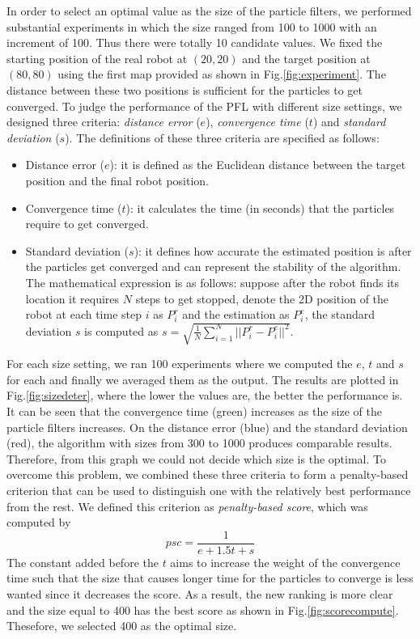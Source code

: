 \documentclass[12pt]{article}
\begin{document}
In order to select an optimal value as the size of the particle filters, we performed substantial experiments in which the size ranged from 100 to 1000 with an increment of 100. Thus there were totally 10 candidate values. We fixed the starting position of the real robot at $(20,20)$ and the target position at $(80,80)$ using the first map provided as shown in Fig.\ref{fig:experiment}. The distance between these two positions is sufficient for the particles to get converged. To judge the performance of the PFL with different size settings, we designed three criteria: {\itshape distance error} ($e$), {\itshape convergence time} ($t$) and {\itshape standard deviation} ($s$). The definitions of these three criteria are specified as follows:

\begin{itemize}
  \item Distance error ($e$): it is defined as the Euclidean distance between the target position and the final robot position.
  \item Convergence time ($t$): it calculates the time (in seconds) that the particles require to get converged.
  \item Standard deviation ($s$): it defines how accurate the estimated position is after the particles get converged and can represent the stability of the algorithm. The mathematical expression is as follows: suppose after the robot finds its location it requires $N$ steps to get stopped, denote the 2D position of the robot at each time step $i$ as $P^{r}_{i}$ and the estimation as $P^{e}_{i}$, the standard deviation $s$ is computed as $s = \sqrt{ \frac{1}{N}\sum_{i=1}^{N}||P^{r}_{i} - P^{e}_{i}||^{2} }$.
\end{itemize}

For each size setting, we ran 100 experiments where we computed the $e$, $t$ and $s$ for each and finally we averaged them as the output. The results are plotted in Fig.\ref{fig:sizedeter}, where the lower the values are, the better the performance is. It can be seen that the convergence time (green) increases as the size of the particle filters increases. On the distance error (blue) and the standard deviation (red), the algorithm with sizes from 300 to 1000 produces comparable results. Therefore, from this graph we could not decide which size is the optimal. To overcome this problem, we combined these three criteria to form a penalty-based criterion that can be used to distinguish one with the relatively best performance from the rest. We defined this criterion as {\itshape penalty-based score}, which was computed by $$psc = \frac{1}{e+1.5t+s}$$ The constant added before the $t$ aims to increase the weight of the convergence time such that the size that causes longer time for the particles to converge is less wanted since it decreases the score. As a result, the new ranking is more clear and the size equal to 400 has the best score as shown in Fig.\ref{fig:scorecompute}. Thesefore, we selected 400 as the optimal size.
\end{document}
